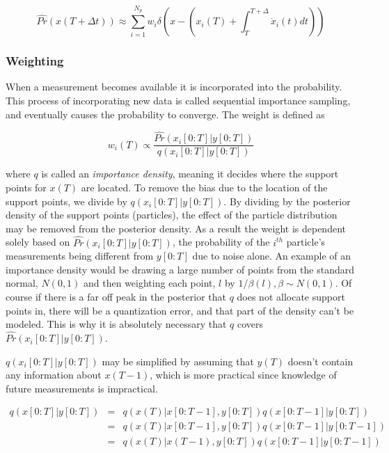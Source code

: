 \documentclass{article}
\begin{document}
\begin{equation}
\hat{Pr}(x(T+\Delta t)) \approx 
\sum_{i=1}^{N_p} w_i\delta\left(x - (x_i(T) + \int_T^{T+\Delta} \dot{x}_i(t) dt) \right)
\end{equation}

\subsubsection{Weighting}
When a measurement becomes available it is incorporated into the probability.
This process of incorporating new data is called sequential importance sampling,
and eventually causes the probability to converge. The weight is defined
as

\begin{equation}
\label{weightfunc}
w_i(T) \propto \frac{\hat{Pr}(x_i[0:T] | y[0:T])}{q(x_i[0:T] | y[0:T])}
\end{equation}

where $q$ is called an \emph{importance density}, meaning it decides where
the support points for $x(T)$ are located. To remove the bias due to the
location of the support points, we divide by $q(x_i[0:T] | y[0:T])$. By dividing by 
the posterior density of the support points (particles), the effect of the particle 
distribution may be removed from the posterior density. As a result the weight
is dependent solely based
on $\hat{Pr}(x_i[0:T] | y[0:T])$, the probability of the $i^{th}$ particle's measurements
being different from $y[0:T]$ due to noise alone.
An example of an importance density would be drawing a large
number of points from the standard normal, $N(0,1)$ and then weighting each point, $l$ by 
$1/\beta(l), \beta \sim N(0,1)$. Of course if there is a far off peak in
the posterior that $q$ does not allocate support points in, there will 
be a quantization error, and that part of the density can't be modeled. This is why
it is absolutely necessary that $q$ covers $\hat{Pr}(x_i[0:T] | y[0:T])$.

$q(x_i[0:T] | y[0:T])$ may be simplified by assuming that $y(T)$ doesn't contain 
any information about $x(T-1)$, which is more practical since knowledge of future
measurements is impractical. 

\begin{eqnarray}
q(x[0:T] | y[0:T]) & = & q(x(T) | x[0:T-1], y[0:T])q(x[0:T-1] | y[0:T]) \nonumber \\
& = & q(x(T) | x[0:T-1], y[0:T])q(x[0:T-1] | y[0:T-1]) \nonumber \\
& = & q(x(T) | x(T-1), y[0:T])q(x[0:T-1] | y[0:T-1])
\end{eqnarray}
\end{document}
